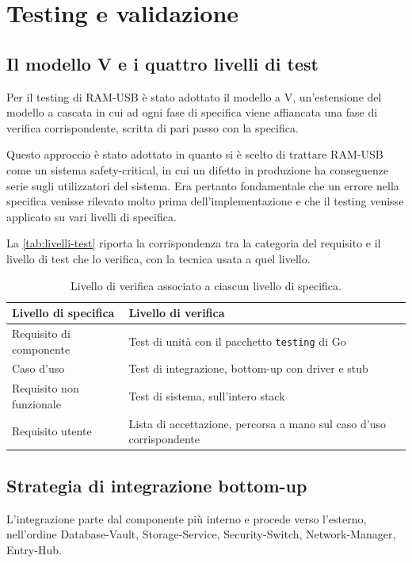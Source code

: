 \chapter{Testing e validazione}
\label{chap:testing}

\section{Il modello V e i quattro livelli di test}
Per il testing di RAM-USB è stato adottato il modello a V, un'estensione del modello a cascata in cui 
ad ogni fase di specifica viene affiancata una fase di verifica corrispondente, scritta di pari passo con 
la specifica. 

Questo approccio è stato adottato in quanto si è scelto di trattare RAM-USB come un sistema 
safety-critical, in cui un difetto in produzione ha conseguenze serie sugli utilizzatori del sistema. 
Era pertanto fondamentale che un errore nella specifica venisse rilevato molto prima dell'implementazione e 
che il testing venisse applicato su vari livelli di specifica.  

La \autoref{tab:livelli-test} riporta la corrispondenza tra la categoria del requisito e il livello di
test che lo verifica, con la tecnica usata a quel livello.

\begin{table}[H]
\centering
\caption{Livello di verifica associato a ciascun livello di specifica.}
\label{tab:livelli-test}
\begin{tabular}{@{}l p{}@{}}
\hline
\textbf{Livello di specifica} & \textbf{Livello di verifica} \\
\hline
Requisito di componente & Test di unità con il pacchetto \texttt{testing} di Go \\
Caso d'uso & Test di integrazione, bottom-up con driver e stub \\
Requisito non funzionale & Test di sistema, sull'intero stack \\
Requisito utente & Lista di accettazione, percorsa a mano sul caso d'uso corrispondente \\
\hline
\end{tabular}
\end{table}

\section{Strategia di integrazione bottom-up}

L'integrazione parte dal componente più interno e procede verso l'esterno, nell'ordine Database-Vault,
Storage-Service, Security-Switch, Network-Manager, Entry-Hub.

